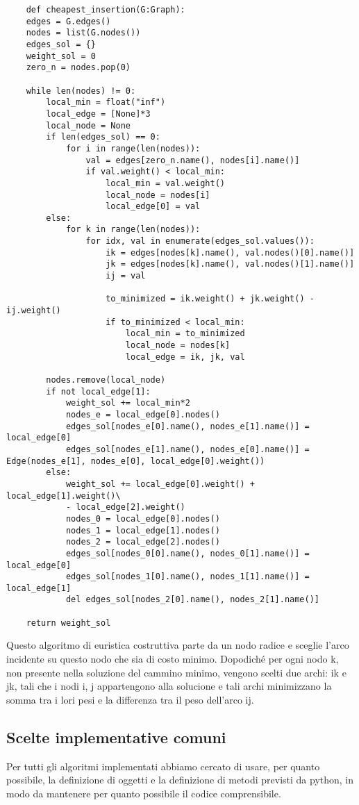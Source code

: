 \begin{verbatim}
    def cheapest_insertion(G:Graph):
    edges = G.edges()
    nodes = list(G.nodes())
    edges_sol = {}
    weight_sol = 0
    zero_n = nodes.pop(0)
    
    while len(nodes) != 0:
        local_min = float("inf")
        local_edge = [None]*3
        local_node = None
        if len(edges_sol) == 0:
            for i in range(len(nodes)):
                val = edges[zero_n.name(), nodes[i].name()]
                if val.weight() < local_min:
                    local_min = val.weight()
                    local_node = nodes[i]
                    local_edge[0] = val
        else:
            for k in range(len(nodes)):
                for idx, val in enumerate(edges_sol.values()):
                    ik = edges[nodes[k].name(), val.nodes()[0].name()]
                    jk = edges[nodes[k].name(), val.nodes()[1].name()]
                    ij = val

                    to_minimized = ik.weight() + jk.weight() - ij.weight()
                    if to_minimized < local_min:
                        local_min = to_minimized
                        local_node = nodes[k]
                        local_edge = ik, jk, val

        nodes.remove(local_node)
        if not local_edge[1]:
            weight_sol += local_min*2
            nodes_e = local_edge[0].nodes()
            edges_sol[nodes_e[0].name(), nodes_e[1].name()] = local_edge[0]
			edges_sol[nodes_e[1].name(), nodes_e[0].name()] = Edge(nodes_e[1], nodes_e[0], local_edge[0].weight())            
        else:
            weight_sol += local_edge[0].weight() + local_edge[1].weight()\
            - local_edge[2].weight()
            nodes_0 = local_edge[0].nodes()
            nodes_1 = local_edge[1].nodes()
            nodes_2 = local_edge[2].nodes()
            edges_sol[nodes_0[0].name(), nodes_0[1].name()] = local_edge[0]
            edges_sol[nodes_1[0].name(), nodes_1[1].name()] = local_edge[1]
            del edges_sol[nodes_2[0].name(), nodes_2[1].name()]

    return weight_sol
\end{verbatim}
Questo algoritmo di euristica costruttiva parte da un nodo radice e sceglie l'arco incidente su questo nodo che sia di costo minimo. 
Dopodiché per ogni nodo k, non presente nella soluzione del cammino minimo, vengono scelti due archi: ik e jk, tali che i nodi i, j appartengono alla solucione e tali archi minimizzano la somma tra i lori pesi e la differenza tra il peso dell'arco ij.

\subsection{Scelte implementative comuni\label{sec:comuni}}
Per tutti gli algoritmi implementati abbiamo cercato di usare, per quanto possibile, la definizione di oggetti e la definizione di metodi previsti da python, in modo da mantenere per quanto possibile il codice comprensibile.